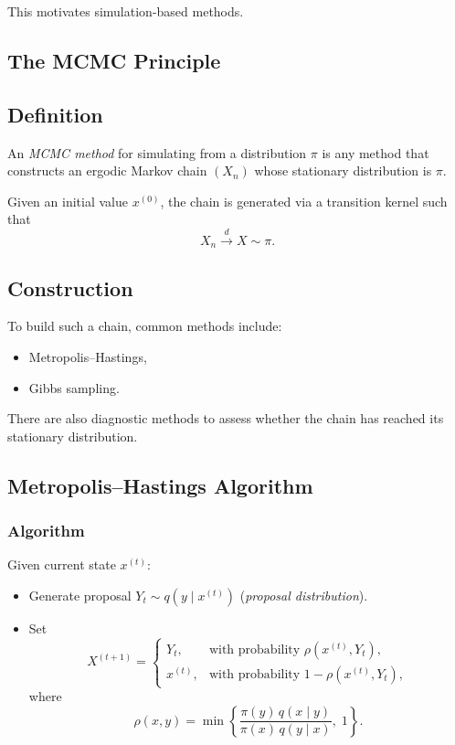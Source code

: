 \documentclass[12pt,oneside]{book}
\numberwithin{equation}{section}
\theoremstyle{definition}
\theoremstyle{plain}
\theoremstyle{remark}
\begin{document}
This motivates simulation-based methods.

\subsection*{The MCMC Principle}

\subsection*{Definition}

An \emph{MCMC method} for simulating from a distribution $\pi$ is any method that constructs an ergodic Markov chain $(X_n)$ whose stationary distribution is $\pi$.

Given an initial value $x^{(0)}$, the chain is generated via a transition kernel such that
\[
X_n \xrightarrow{d} X \sim \pi.
\]

\subsection*{Construction}

To build such a chain, common methods include:
\begin{itemize}
\item Metropolis--Hastings,
\item Gibbs sampling.
\end{itemize}

There are also diagnostic methods to assess whether the chain has reached its stationary distribution.

\subsection*{Metropolis--Hastings Algorithm}

\subsubsection*{Algorithm}

Given current state $x^{(t)}$:

\begin{itemize}
\item Generate proposal $Y_t \sim q(y \mid x^{(t)})$ (\emph{proposal distribution}).
\item Set
\[
X^{(t+1)} =
\begin{cases}
Y_t, & \text{with probability } \rho(x^{(t)}, Y_t), \\
x^{(t)}, & \text{with probability } 1 - \rho(x^{(t)}, Y_t),
\end{cases}
\]
where
\[
\rho(x,y)
=
\min\left\{
\frac{\pi(y)\, q(x \mid y)}{\pi(x)\, q(y \mid x)},\; 1
\right\}.
\]
\end{itemize}
\end{document}
